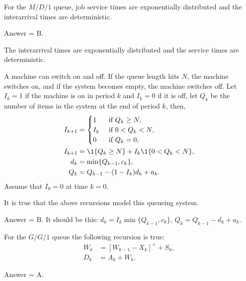 \begin{exercise}[201703]
 For the $M/D/1$ queue, job service times are exponentially
 distributed and the interarrival times are deterministic.

\begin{solution}
 Answer = B.

 The interarrival times are exponentially distributed and the
 service times are deterministic.
\end{solution}
\end{exercise}

\begin{exercise}[201703] 
A machine can switch on and off. If the queue length
 hits $N$, the machine switches on, and if the system becomes empty,
 the machine switches off. Let $I_k=1$ if the machine is on in
 period $k$ and $I_k=0$ if it is off, let $Q_k$ be the number of
 items in the system at the end of period $k$, then, 
 \begin{align*}
 I_{k+1} &=
 \begin{cases}
 1 & \text{ if } Q_{k} \geq N,\\
 I_k & \text{ if } 0< Q_{k} <N,\\
 0 & \text{ if } Q_{k} =0,\\
 \end{cases}\\
 I_{k+1} &= \1{Q_k\geq N} + I_k \1{0<Q_k<N}, \\
d_k &=\min\{Q_{k-1}, c_k\}, \\
Q_k &= Q_{k-1} - (1-I_k) d_k + a_k.
 \end{align*}
 Assume that $I_0 =0$ at time $k=0$. 

It is true that the above
 recursions model this queueing system.

\begin{solution}
 Answer = B.
It should be this: $d_k =I_k \min\{Q_{k-1}, c_k\}$, $Q_k = Q_{k-1} - d_k + a_k$.

\end{solution}
\end{exercise}


\begin{exercise}[201703]
For the $G/G/1$ queue the following recursion is true: 
\begin{align*}
 W_{k} &= [W_{k-1} - X_k]^+ + S_k,\\
 D_k &= A_k + W_k.
\end{align*}

\begin{solution}
 Answer = A.
\end{solution}
\end{exercise}

